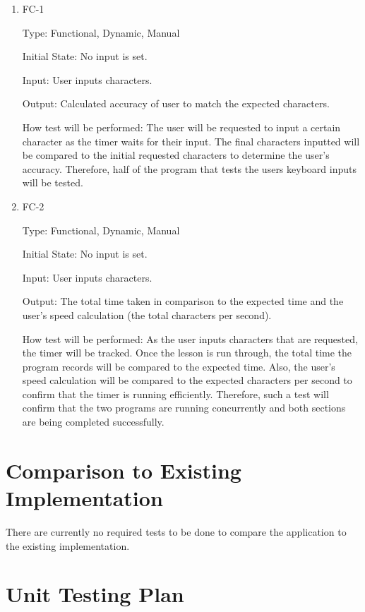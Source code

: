 \documentclass[12pt, titlepage]{article}
\begin{document}
\begin{enumerate}

\item{FC-1\\}

Type: Functional, Dynamic, Manual
					
Initial State: No input is set.
					
Input: User inputs characters.
					
Output: Calculated accuracy of user to match the expected characters.
					
How test will be performed: The user will be requested to input a certain character as the timer waits for their input. The final characters inputted will be compared to the initial requested characters to determine the user's accuracy. Therefore, half of the program that tests the users keyboard inputs will be tested. 
					
\item{FC-2\\}

Type: Functional, Dynamic, Manual
					
Initial State: No input is set.
					
Input: User inputs characters.
					
Output: The total time taken in comparison to the expected time and the user's speed calculation (the total characters per second).
					
How test will be performed: As the user inputs characters that are requested, the timer will be tracked. Once the lesson is run through, the total time the program records will be compared to the expected time. Also, the user's speed calculation will be compared to the expected characters per second to confirm that the timer is running efficiently. Therefore, such a test will confirm that the two programs are running concurrently and both sections are being completed successfully.

\end{enumerate}

	
\section{Comparison to Existing Implementation}	
There are currently no required tests to be done to compare the application to the existing implementation.
				
\section{Unit Testing Plan}
\end{document}
